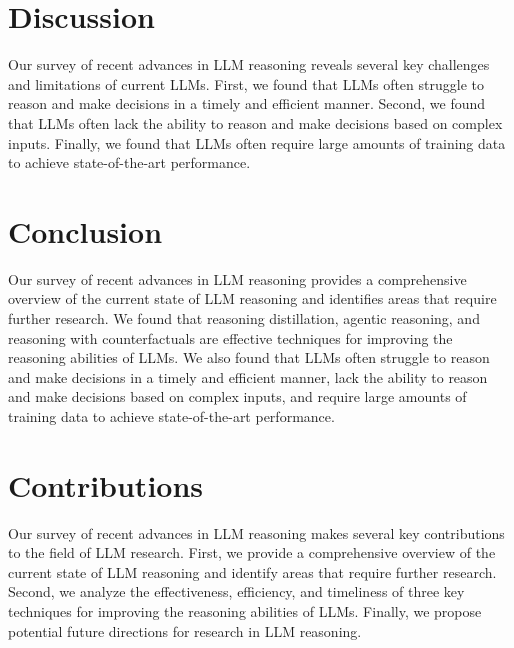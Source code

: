 \documentclass[12pt]{article}
\begin{document}
\section{Discussion}

Our survey of recent advances in LLM reasoning reveals several key challenges and limitations of current LLMs. First, we found that LLMs often struggle to reason and make decisions in a timely and efficient manner. Second, we found that LLMs often lack the ability to reason and make decisions based on complex inputs. Finally, we found that LLMs often require large amounts of training data to achieve state-of-the-art performance.

\section{Conclusion}

Our survey of recent advances in LLM reasoning provides a comprehensive overview of the current state of LLM reasoning and identifies areas that require further research. We found that reasoning distillation, agentic reasoning, and reasoning with counterfactuals are effective techniques for improving the reasoning abilities of LLMs. We also found that LLMs often struggle to reason and make decisions in a timely and efficient manner, lack the ability to reason and make decisions based on complex inputs, and require large amounts of training data to achieve state-of-the-art performance.

\section{Contributions}

Our survey of recent advances in LLM reasoning makes several key contributions to the field of LLM research. First, we provide a comprehensive overview of the current state of LLM reasoning and identify areas that require further research. Second, we analyze the effectiveness, efficiency, and timeliness of three key techniques for improving the reasoning abilities of LLMs. Finally, we propose potential future directions for research in LLM reasoning.
\end{document}
